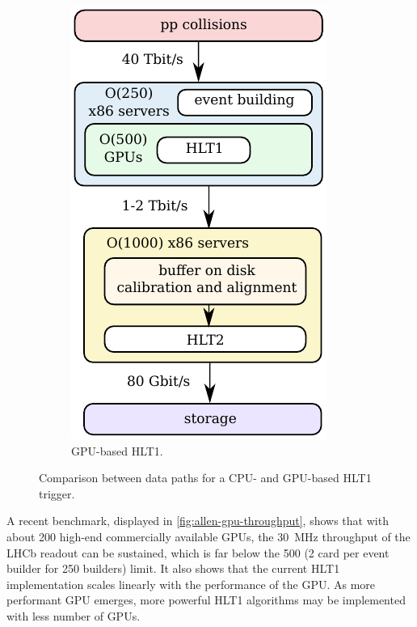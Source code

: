 \begin{figure}[!htb]
\begin{subfigure}[t]{0.36\textwidth}
        \includegraphics[width=\textwidth]{./figs-lhcb-upgrade-overview/trigger/data_path_gpu.pdf}
        \caption{GPU-based HLT1.}
    \end{subfigure}

    \caption{
        Comparison between data paths for a CPU- and GPU-based HLT1 trigger.
    }
    \label{fig:cpu-vs-gpu-hlt1}
\end{figure}

A recent benchmark, displayed in \cref{fig:allen-gpu-throughput},
shows that with about 200 high-end commercially available GPUs, the
30~MHz throughput of the LHCb readout can be sustained,
which is far below the 500 (2 card per event builder for 250 builders) limit.
It also shows that the current HLT1 implementation scales linearly with
the performance of the GPU.
As more performant GPU emerges, more powerful HLT1 algorithms may be implemented
with less number of GPUs.

